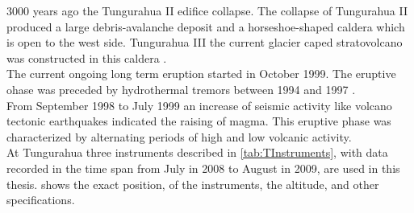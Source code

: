 \documentclass  [
  paper    = a4,
  BCOR     = 10mm,
  twoside,
  fontsize = 12pt,
  fleqn,
  toc      = bibnumbered,
  toc      = listofnumbered,
  numbers  = noendperiod,
  headings = normal,
  listof   = leveldown,
  version  = 3.03
]                                       {scrreprt}
\begin{document}
	3000 years ago the Tungurahua II edifice collapse. The collapse of Tungurahua II produced a large debris-avalanche deposit and a horseshoe-shaped caldera which is open to the west side. Tungurahua III the current glacier caped stratovolcano was constructed in this caldera \citep{GlobalVolcanismProgram}.\\
	The current ongoing long term eruption started in October 1999. The eruptive ohase was preceded by hydrothermal tremors between 1994 and 1997 \citep{samaniego2003peligros}.\\
	From September 1998 to July 1999 an increase of seismic activity like volcano tectonic earthquakes indicated the raising of magma. This eruptive phase was characterized by alternating periods of high and low volcanic activity. \\

	At Tungurahua three instruments described  in \cref{tab:TInstruments}, with data recorded in the time span from July in 2008 to August in 2009, are used in this thesis.
	 shows the exact position, of the instruments, the altitude, and other specifications. \\
\end{document}
